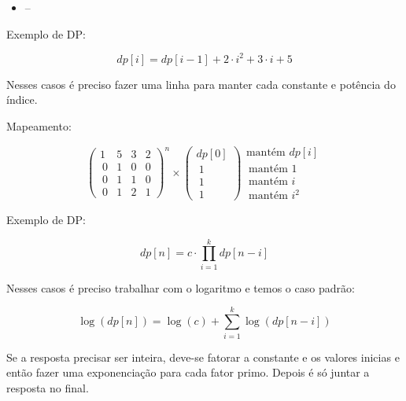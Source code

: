 \documentclass[10pt, a4paper, oneside]{book}
\begin{document}
\begin{itemize}
\item --
\end{itemize}

\textbf{} 


Exemplo de DP:   



$$ dp[i] = dp[i-1] + 2 \cdot i^2 + 3 \cdot i + 5 $$



Nesses casos é preciso fazer uma linha para manter cada constante e potência do índice.



Mapeamento:



$$ \begin{pmatrix} 1&5&3&2 \\\ 0&1&0&0 \\\ 0&1&1&0 \\\ 0&1&2&1 \end{pmatrix}^n \times \begin{pmatrix} dp[0]   \\\ 1       \\\ 1       \\\ 1\end {pmatrix} \begin{matrix} \text{mantém } dp[i]   \\\ \text{mantém }1       \\\ \text{mantém }i       \\\ \text{mantém }i^2      \end {matrix} $$



\textbf{} 


Exemplo de DP:



$$ dp[n] = c \cdot \prod_{i=1}^{k} dp[n-i] $$



Nesses casos é preciso trabalhar com o logaritmo e temos o caso padrão:





$$ \log(dp[n]) = \log(c) + \sum_{i=1}^{k} \log(dp[n-i]) $$



Se a resposta precisar ser inteira, deve-se fatorar a constante e os valores inicias e então fazer uma exponenciação para cada fator primo. Depois é só juntar a resposta no final.

\hfill
\end{document}
